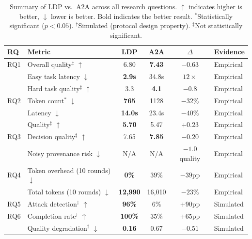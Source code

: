 \begin{table}[t]
\centering
\caption{Summary of LDP vs.\ A2A across all research questions. $\uparrow$ indicates higher is better, $\downarrow$ lower is better. Bold indicates the better result. $^*$Statistically significant ($p<0.05$). $^\dagger$Simulated (protocol design property). $^\ddagger$Not statistically significant.}
\label{tab:summary}
\begin{tabular}{llcccl}
\toprule
RQ & Metric & LDP & A2A & $\Delta$ & Evidence \\
\midrule
RQ1 & Overall quality$^\ddagger$ $\uparrow$ & 6.80 & \textbf{7.43} & $-0.63$ & Empirical \\
 & Easy task latency $\downarrow$ & \textbf{2.9s} & 34.8s & $12\times$ & Empirical \\
 & Hard task quality$^\ddagger$ $\uparrow$ & 3.3 & \textbf{4.1} & $-0.8$ & Empirical \\
\midrule
RQ2 & Token count$^*$ $\downarrow$ & \textbf{765} & 1128 & $-32\%$ & Empirical \\
 & Latency $\downarrow$ & \textbf{14.0s} & 23.4s & $-40\%$ & Empirical \\
 & Quality$^\ddagger$ $\uparrow$ & \textbf{5.70} & 5.47 & +0.23 & Empirical \\
\midrule
RQ3 & Decision quality$^\ddagger$ $\uparrow$ & 7.65 & \textbf{7.85} & $-0.20$ & Empirical \\
 & Noisy provenance risk $\downarrow$ & N/A & N/A & $-1.0$ quality & Empirical \\
\midrule
RQ4 & Token overhead (10 rounds) $\downarrow$ & \textbf{0\%} & 39\% & $-39\text{pp}$ & Empirical \\
 & Total tokens (10 rounds) $\downarrow$ & \textbf{12,990} & 16,010 & $-23\%$ & Empirical \\
\midrule
RQ5 & Attack detection$^\dagger$ $\uparrow$ & \textbf{96\%} & 6\% & $+90\text{pp}$ & Simulated \\
\midrule
RQ6 & Completion rate$^\dagger$ $\uparrow$ & \textbf{100\%} & 35\% & $+65\text{pp}$ & Simulated \\
 & Quality degradation$^\dagger$ $\downarrow$ & \textbf{0.16} & 0.67 & $-0.51$ & Simulated \\
\bottomrule
\end{tabular}
\end{table}
